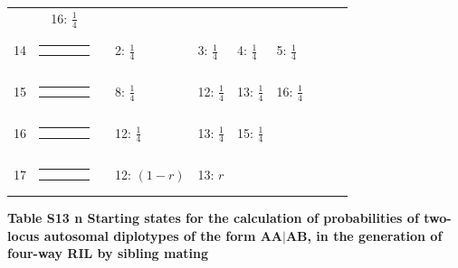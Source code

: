 \documentclass[9pt,letterpaper,twoside]{article}
\begin{document}
{\begin{center}
\begin{tabular}{ccclllllll}
& 16: $\frac{1}{4}$
& & & & \\
14 &
{\renewcommand{\arraystretch}{0.3}
\renewcommand{\tabcolsep}{0.5mm}
\parbox[b][3mm][c]{12mm}{
\begin{tabular}{|p{2mm}|p{2mm}||p{2mm}|p{2mm}|} \hline
$\bullet$ & $\bullet$ &           &           \\
          &           & $\bullet$ & $\circ  $ \\ \hline
\end{tabular}}}
&
& 2: $\frac{1}{4}$
& 3: $\frac{1}{4}$
& 4: $\frac{1}{4}$
& 5: $\frac{1}{4}$
& & & \\
15 &
{\renewcommand{\arraystretch}{0.3}
\renewcommand{\tabcolsep}{0.5mm}
\parbox[b][3mm][c]{12mm}{
\begin{tabular}{|p{2mm}|p{2mm}||p{2mm}|p{2mm}|} \hline
$\bullet$ &           &           &           \\
          &           & $\bullet$ & $\circ  $ \\ \hline
\end{tabular}}}
&
& 8: $\frac{1}{4}$
& 12: $\frac{1}{4}$
& 13: $\frac{1}{4}$
& 16: $\frac{1}{4}$
& & & \\
16 &
{\renewcommand{\arraystretch}{0.3}
\renewcommand{\tabcolsep}{0.5mm}
\parbox[b][3mm][c]{12mm}{
\begin{tabular}{|p{2mm}|p{2mm}||p{2mm}|p{2mm}|} \hline
$\bullet$ &           &           &           \\
          & $\bullet$ & $\circ  $ &           \\ \hline
\end{tabular}}}
&
& 12: $\frac{1}{4}$
& 13: $\frac{1}{4}$
& 15: $\frac{1}{4}$
& & & & \\
17 &
{\renewcommand{\arraystretch}{0.3}
\renewcommand{\tabcolsep}{0.5mm}
\parbox[b][3mm][c]{12mm}{
\begin{tabular}{|p{2mm}|p{2mm}||p{2mm}|p{2mm}|} \hline
$\bullet$ &           &           &           \\
$\circ  $ & $\bullet$ &           &           \\ \hline
\end{tabular}}}
&
& 12: $(1-r)$
& 13: $r$
& & & & & \\
\hline
\end{tabular}
\end{center}
}

\newpage

\noindent \textbf{Table S13 {\color{white} n} Starting states for the calculation of
probabilities of two-locus autosomal diplotypes of the form $\boldsymbol{AA|AB}$,
in the generation of four-way RIL by sibling mating}
\end{document}
